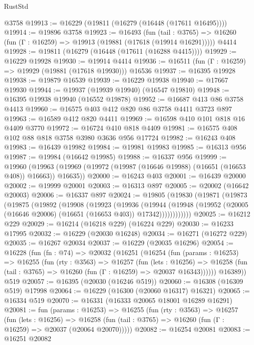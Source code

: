 \begin{lexlean}{RustStd}
\begin{coremodule}
    @3758
@19913 := @16229 (@19811 (@16279 (@16448 (@17611 @16495))))
@19914 := @19896 @3758
@19923 := @16493
    (fun (tail : @3765) => @16260 (fun (Γ : @16259) => @19913 (@19881 (@17618 (@19914 @16291)))))
    @4414
@19928 := @19811 (@16279 (@16448 (@17611 (@16288 @4415))))
@19929 := @16229 @19928
@19930 := @19914 @4414
@19936 := @16511 (fun (Γ : @16259) => @19929 (@19881 (@17618 @19930))) @16536
@19937 := @16395 @19928
@19938 := @19879 @16539
@19939 := @16229 @19938
@19940 := @17667 @19930
@19944 := @19937 (@19939 @19940) (@16547 @19810)
@19948 := @16395 @19938 @19940 (@16552 @19878)
@19952 := @16687 @413 @86 @3758 @4413
@19960 := @16575 @403 @412 @820 @86 @3758 @4411 @3723 @897
@19963 := @16589 @412 @820 @4411
@19969 := @16598 @410 @101 @818 @16 @4409 @3770
@19972 := @16724 @410 @818 @4409
@19981 := @16575 @408 @102 @88 @818 @3758 @3980 @3636 @956 @17724
@19982 := @16243 @408
@19983 := @16439 @19982
@19984 := @19981 @19983
@19985 := @16313 @956
@19987 := @19984 (@16642 @19985)
@19988 := @16337 @956
@19999 := @19960
    (@19963 (@19969 (@19972 (@19987 (@16646 @19988) (@16651 (@16653 @408)) @16663)) @16635))
@20000 := @16243 @403
@20001 := @16439 @20000
@20002 := @19999 @20001
@20003 := @16313 @897
@20005 := @20002 (@16642 @20003)
@20006 := @16337 @897
@20024 := @19805
    (@19830
      (@19871
        (@19873
          (@19875
            (@19892
              (@19908
                (@19923
                  (@19936
                    (@19944
                      (@19948
                        (@19952 (@20005 (@16646 @20006) (@16651 (@16653 @403)) @17342))))))))))))
@20025 := @16212 @229
@20029 := @16214 (@16218 @229) (@16224 @229)
@20030 := @16233 @17995
@20032 := @16229 (@20030 @16248)
@20034 := @16271 (@16272 @229)
@20035 := @16267 @20034
@20037 := @16229 (@20035 @16296)
@20054 := @16228
    (fun (fn : @74) =>
    @20032
      (@16251
        (@16254
          (fun (params : @16253) =>
          @16255
            (fun (rty : @3563) =>
            @16257
              (fun (lets : @16256) =>
              @16258 (fun (tail : @3765) => @16260 (fun (Γ : @16259) => @20037 @16343))))))
        @16389))
    @519
@20057 := @16395 (@20030 (@16246 @519))
@20060 := @16308 (@16309 @519) @17998
@20064 := @16229 (@16300 (@20060 @16317) @16321)
@20065 := @16334 @519
@20070 := @16331 (@16333 @20065 @18001 @16289 @16291)
@20081 := fun (params : @16253) =>
  @16255
    (fun (rty : @3563) =>
    @16257
      (fun (lets : @16256) =>
      @16258 (fun (tail : @3765) => @16260 (fun (Γ : @16259) => @20037 (@20064 @20070)))))
@20082 := @16254 @20081
@20083 := @16251 @20082

\end{coremodule}
\end{lexlean}
